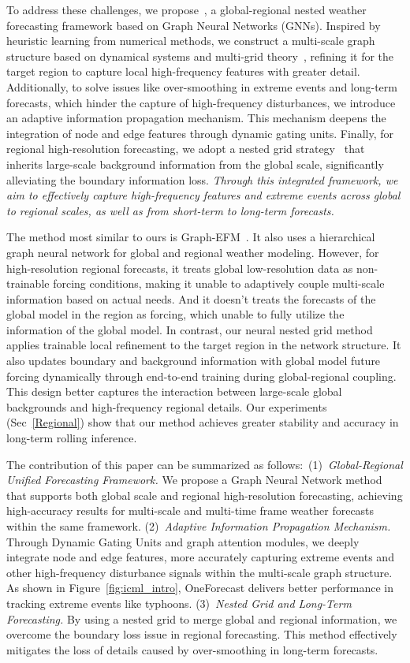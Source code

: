 To address these challenges, we propose~\method{}, a global-regional nested weather forecasting framework based on Graph Neural Networks (GNNs). Inspired by heuristic learning from numerical methods, we construct a multi-scale graph structure based on dynamical systems and multi-grid theory~\cite{he2019mgnet,hemgno}, refining it for the target region to capture local high-frequency features with greater detail. Additionally, to solve issues like over-smoothing in extreme events and long-term forecasts, which hinder the capture of high-frequency disturbances, we introduce an adaptive information propagation mechanism. This mechanism deepens the integration of node and edge features through dynamic gating units. Finally, for regional high-resolution forecasting, we adopt a nested grid strategy~\cite{phillips1973strategy} that inherits large-scale background information from the global scale, significantly alleviating the boundary information loss. \textit{Through this integrated framework, we aim to effectively capture high-frequency features and extreme events across global to regional scales, as well as from short-term to long-term forecasts.}

The method most similar to ours is Graph-EFM~\cite{oskarsson2024probabilistic}. It also uses a hierarchical graph neural network for global and regional weather modeling. However, for high-resolution regional forecasts, it treats global low-resolution data as non-trainable forcing conditions, making it unable to adaptively couple multi-scale information based on actual needs. And it doesn't treats the forecasts of the global model in the region as forcing, which unable to fully utilize the information of the global model. In contrast, our neural nested grid method applies trainable local refinement to the target region in the network structure. It also updates boundary and background information with global model future forcing dynamically through end-to-end training during global-regional coupling. This design better captures the interaction between large-scale global backgrounds and high-frequency regional details. Our experiments (Sec~\ref{Regional}) show that our method achieves greater stability and accuracy in long-term rolling inference.


The contribution of this paper can be summarized as follows:~(1)~\textit{Global-Regional Unified Forecasting Framework.} We propose a Graph Neural Network method that supports both global scale and regional high-resolution forecasting, achieving high-accuracy results for multi-scale and multi-time frame weather forecasts within the same framework. (2)~\textit{Adaptive Information Propagation Mechanism.} Through Dynamic Gating Units and graph attention modules, we deeply integrate node and edge features, more accurately capturing extreme events and other high-frequency disturbance signals within the multi-scale graph structure. As shown in Figure~\ref{fig:icml_intro}, OneForecast delivers better performance in tracking extreme events like typhoons. (3)~\textit{Nested Grid and Long-Term Forecasting.} By using a nested grid to merge global and regional information, we overcome the boundary loss issue in regional forecasting. This method effectively mitigates the loss of details caused by over-smoothing in long-term forecasts.
